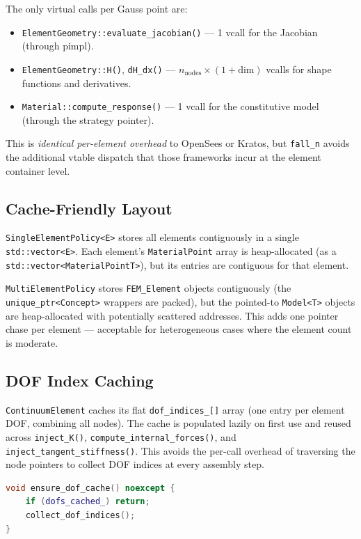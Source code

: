 The only virtual calls per Gauss point are:
\begin{itemize}[nosep]
  \item \texttt{ElementGeometry::evaluate\_jacobian()} --- 1 vcall for the
        Jacobian (through pimpl).
  \item \texttt{ElementGeometry::H()}, \texttt{dH\_dx()} --- $n_\text{nodes}
        \times (1 + \text{dim})$ vcalls for shape functions and derivatives.
  \item \texttt{Material::compute\_response()} --- 1 vcall for the
        constitutive model (through the strategy pointer).
\end{itemize}
This is \emph{identical per-element overhead} to OpenSees or Kratos, but
\texttt{fall\_n} avoids the additional vtable dispatch that those frameworks
incur at the element container level.

\subsection{Cache-Friendly Layout}

\texttt{SingleElementPolicy<E>} stores all elements contiguously in a single
\texttt{std::vector<E>}.  Each element's \texttt{MaterialPoint} array is
heap-allocated (as a \texttt{std::vector<MaterialPointT>}), but its entries
are contiguous for that element.

\texttt{MultiElementPolicy} stores \texttt{FEM\_Element} objects contiguously
(the \texttt{unique\_ptr<Concept>} wrappers are packed), but the pointed-to
\texttt{Model<T>} objects are heap-allocated with potentially scattered
addresses.  This adds one pointer chase per element --- acceptable for
heterogeneous cases where the element count is moderate.

\subsection{DOF Index Caching}

\texttt{ContinuumElement} caches its flat \texttt{dof\_indices\_[]} array
(one entry per element DOF, combining all nodes).  The cache is populated
lazily on first use and reused across \texttt{inject\_K()},
\texttt{compute\_internal\_forces()}, and \texttt{inject\_tangent\_stiffness()}.
This avoids the per-call overhead of traversing the node pointers to
collect DOF indices at every assembly step.
\begin{lstlisting}[language=C++]
void ensure_dof_cache() noexcept {
    if (dofs_cached_) return;
    collect_dof_indices();
}
\end{lstlisting}

